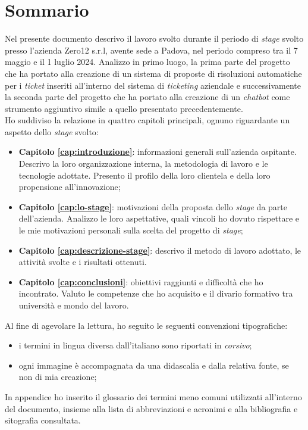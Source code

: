 \cleardoublepage
{}
{}
\begingroup
\let\clearpage\relax
\let\cleardoublepage\relax
\let\cleardoublepage\relax
\chapter*{Sommario}
Nel presente documento descrivo il lavoro svolto durante il periodo di \textit{stage} svolto presso l'azienda Zero12 s.r.l, avente sede a Padova, nel periodo compreso tra il 7 maggio e il 1 luglio 2024.
Analizzo in primo luogo, la prima parte del progetto che ha portato alla creazione di un sistema di proposte di risoluzioni automatiche per i \textit{ticket} inseriti all'interno del sistema di \textit{ticketing} aziendale e successivamente la seconda parte del progetto che ha portato alla creazione di un \textit{chatbot} come strumento aggiuntivo simile a quello presentato precedentemente. \\
Ho suddiviso la relazione in quattro capitoli principali, ognuno riguardante un aspetto dello \textit{stage} svolto: 
\begin{itemize}
    \item \textbf{Capitolo \ref{cap:introduzione}}: informazioni generali sull'azienda ospitante. Descrivo la loro organizzazione interna, la metodologia di lavoro e le tecnologie adottate. Presento il profilo della loro clientela e della loro propensione all'innovazione;
    \item \textbf{Capitolo \ref{cap:lo-stage}}: motivazioni della proposta dello \textit{stage} da parte dell'azienda. Analizzo le loro aspettative, quali vincoli ho dovuto rispettare e le mie motivazioni personali sulla scelta del progetto di \textit{stage};
    \item \textbf{Capitolo \ref{cap:descrizione-stage}}: descrivo il metodo di lavoro adottato, le attività svolte e i risultati ottenuti. 
    \item \textbf{Capitolo \ref{cap:conclusioni}}: obiettivi raggiunti e difficoltà che ho incontrato. Valuto le competenze che ho acquisito e il divario formativo tra università e mondo del lavoro.
\end{itemize}
\noindent
Al fine di agevolare la lettura, ho seguito le seguenti convenzioni tipografiche:
\begin{itemize}
    \item i termini in lingua diversa dall'italiano sono riportati in \textit{corsivo};
    \item ogni immagine è accompagnata da una didascalia e dalla relativa fonte, se non di mia creazione;
\end{itemize}
\noindent
In appendice ho inserito il glossario dei termini meno comuni utilizzati all'interno del documento, insieme alla lista di abbreviazioni e acronimi e alla bibliografia e sitografia consultata.


\endgroup

\vfill
